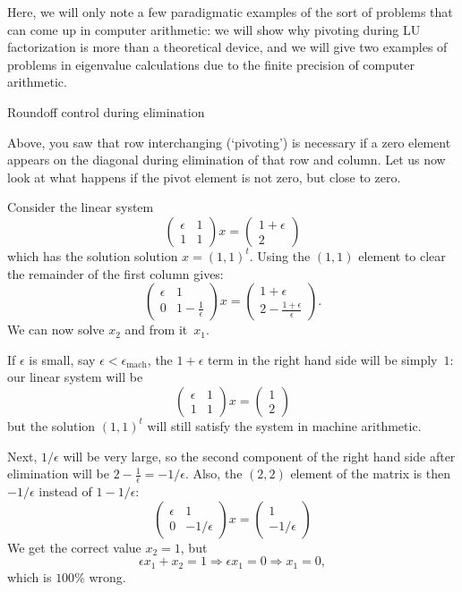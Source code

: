Here, we will only note a few paradigmatic examples of the sort of
problems that can come up in computer arithmetic: we will show why
pivoting during LU factorization is more than a theoretical device,
and we will give two examples of problems in eigenvalue calculations
due to the finite precision of computer arithmetic.

 {Roundoff control during elimination}

Above, you saw that row interchanging (`pivoting') is necessary if a
zero element appears on the diagonal during elimination of that row
and column. Let us now look at what happens if the pivot element is
not zero, but close to zero.

Consider the linear system
\[ \left(
  \begin{matrix}
    \epsilon&1\\ 1&1
  \end{matrix}\right) x = \left(
  \begin{matrix}
    1+\epsilon\\2
  \end{matrix}\right)
\] 
which has the solution solution $x=(1,1)^t$.
Using the $(1,1)$ element to clear the remainder of the first column gives:
\[ \left(
  \begin{matrix}
    \epsilon&1\\ 0&1-\frac1\epsilon
  \end{matrix}\right) x = \left(
  \begin{matrix}
    1+\epsilon\\ 2-\frac{1+\epsilon}\epsilon
  \end{matrix}\right).
\]
We can now solve $x_2$ and from it~$x_1$.

If $\epsilon$ is small, say $\epsilon<\epsilon_{\mathrm{mach}}$,
the $1+\epsilon$ term in the right hand side will be simply~$1$: our
linear system will be
\[ \left(
  \begin{matrix}
    \epsilon&1\\ 1&1
  \end{matrix}\right) x = \left(
  \begin{matrix}
    1\\2
  \end{matrix}\right)
\] 
but the solution $(1,1)^t$ will still satisfy the system in machine
arithmetic.

Next, $1/\epsilon$ will be very large, so the second component of the
right hand side after elimination will be
$2-\frac1\epsilon=-1/\epsilon$.
Also, the $(2,2)$ element of the matrix is then $-1/\epsilon$ instead of
$1-1/\epsilon$:
\[ 
  \begin{pmatrix}
    \epsilon&1\\ 0&-1/\epsilon
  \end{pmatrix} x = 
  \begin{pmatrix}
    1\\-1/\epsilon
  \end{pmatrix}
\] 
We get the correct value $x_2=1$, but
\[ \epsilon x_1+x_2=1 \Rightarrow \epsilon x_1=0 \Rightarrow x_1=0, \]
which is $100\%$ wrong.

